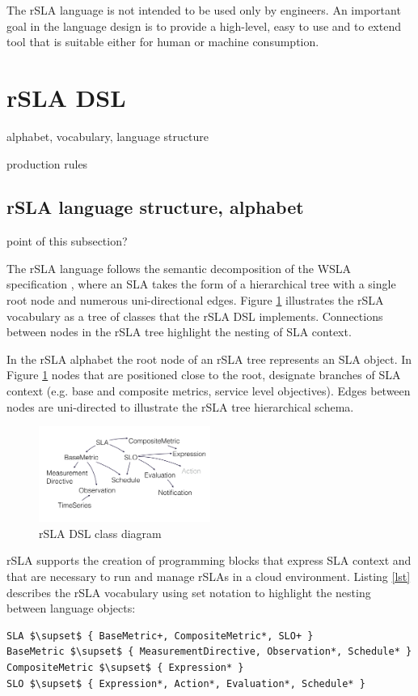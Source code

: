 \documentclass{llncs}
\begin{document}
The rSLA language is not intended to be used only by engineers. An important goal in the language design is to provide a high-level, easy to use and to extend tool that is suitable either for human or machine consumption.

\section{rSLA DSL}

alphabet, vocabulary, language structure

production rules


\subsection{rSLA language structure, alphabet}

 point of this subsection?

The rSLA language follows the semantic decomposition of the WSLA specification \cite{wsla}, where an SLA takes the form of a hierarchical tree with a single root node and numerous uni-directional edges. Figure \ref{rSLA_diag} illustrates the rSLA vocabulary as a tree of classes that the rSLA DSL implements. Connections between nodes in the rSLA tree highlight the nesting of SLA context. 

In the rSLA alphabet the root node of an rSLA tree represents an SLA object. In Figure \ref{rSLA_diag} nodes that are positioned close to the root, designate branches of SLA context (e.g. base and composite metrics, service level objectives). Edges between nodes are uni-directed to illustrate the rSLA tree hierarchical schema.

\begin{figure}
  \centering
    \includegraphics[width=0.5\textwidth]{pics/rslauser}
    \caption{rSLA DSL class diagram}
    \label{rSLA_diag}
\end{figure}

 rSLA supports the creation of programming blocks that express SLA context and that are necessary to run and manage rSLAs in a cloud environment. Listing \ref{lst} describes the rSLA vocabulary using set notation to highlight the nesting between language objects:
\begin{lstlisting}[breaklines, mathescape, firstnumber=auto, caption=rSLA vocabulary, label=lst]
SLA $\supset$ { BaseMetric+, CompositeMetric*, SLO+ }
BaseMetric $\supset$ { MeasurementDirective, Observation*, Schedule* }
CompositeMetric $\supset$ { Expression* }
SLO $\supset$ { Expression*, Action*, Evaluation*, Schedule* }
\end{lstlisting}
\end{document}
